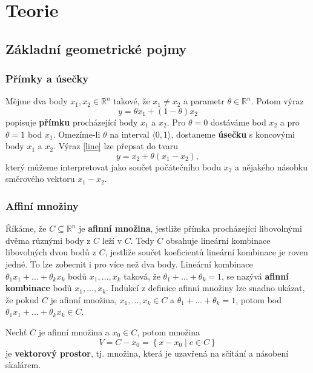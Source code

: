 \part{Teorie}

\chapter{Základní geometrické pojmy}

\section{Přímky a úsečky}

Mějme dva body $x_1, x_2 \in \mathbb{R}^n$ takové, že $x_1 \neq x_2$ a parametr $\theta \in \mathbb{R}^n$. Potom výraz
\begin{equation}
    y = \theta x_1 + (1 - \theta) x_2
    \label{line}
\end{equation}
popisuje \textbf{přímku} procházející body $x_1$ a $x_2$. Pro $\theta = 0$ dostáváme bod $x_2$ a pro $\theta = 1$ bod $x_1$. Omezíme-li $\theta$ na interval $\langle 0, 1 \rangle$, dostaneme \textbf{úsečku} s koncovými body $x_1$ a $x_2$. Výraz \ref{line} lze přepsat do tvaru
$$
    y = x_2 + \theta (x_1 - x_2),
$$
který můžeme interpretovat jako součet počátečního bodu $x_2$ a nějakého násobku směrového vektoru $x_1 - x_2$.

\section{Affiní množiny}

Říkáme, že $C \subseteq \mathbb{R}^n$ je \textbf{afinní množina}, jestliže přímka procházející libovolnými dvěma různými body z $C$ leží v $C$. Tedy $C$ obsahuje lineární kombinace libovolných dvou bodů z $C$, jestliže součet koeficientů lineární kombinace je roven jedné. To lze zobecnit i pro více než dva body. Lineární kombinace $\theta_1 x_1 + \dots + \theta_k x_k$ bodů $x_1, \dots, x_k$ taková, že $\theta_1 + \dots + \theta_k = 1$, se nazývá \textbf{afinní kombinace} bodů $x_1, \dots, x_k$. Indukcí z definice afinní množiny lze snadno ukázat, že pokud $C$ je afinní množina, $x_1, \dots, x_k \in C$ a $\theta_1 + \dots + \theta_k = 1$, potom bod $\theta_1 x_1 + \dots + \theta_k x_k \in C$.

\noindent Nechť $C$ je afinní množina a $x_0 \in C$, potom množina
$$
    V = C - x_0 = \left\{ x - x_0 \mid c \in C \right\}
$$
je \textbf{vektorový prostor}, tj. množina, která je uzavřená na sčítání a násobení skalárem.

